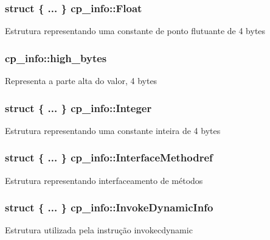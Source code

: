 \subsubsection[{\texorpdfstring{Float}{Float}}]{\setlength{\rightskip}{0pt plus 5cm}struct \{ ... \}   cp\+\_\+info\+::\+Float}\hypertarget{structcp__info_aab782dac6a2cafce3e898190d49329df}{}\label{structcp__info_aab782dac6a2cafce3e898190d49329df}
Estrutura representando uma constante de ponto flutuante de 4 bytes 
\subsubsection[{\texorpdfstring{high\+\_\+bytes}{high_bytes}}]{ cp\+\_\+info\+::high\+\_\+bytes}\hypertarget{structcp__info_a26996f9b4a0caab37c9cdbfd027eaed7}{}\label{structcp__info_a26996f9b4a0caab37c9cdbfd027eaed7}
Representa a parte alta do valor, 4 bytes 
\subsubsection[{\texorpdfstring{Integer}{Integer}}]{\setlength{\rightskip}{0pt plus 5cm}struct \{ ... \}   cp\+\_\+info\+::\+Integer}\hypertarget{structcp__info_a2a51febf186f789356c2ce50ed6219c3}{}\label{structcp__info_a2a51febf186f789356c2ce50ed6219c3}
Estrutura representando uma constante inteira de 4 bytes 
\subsubsection[{\texorpdfstring{Interface\+Methodref}{InterfaceMethodref}}]{\setlength{\rightskip}{0pt plus 5cm}struct \{ ... \}   cp\+\_\+info\+::\+Interface\+Methodref}\hypertarget{structcp__info_a7b323182372d6d7a58f0caf6b762db98}{}\label{structcp__info_a7b323182372d6d7a58f0caf6b762db98}
Estrutura representando interfaceamento de métodos 
\subsubsection[{\texorpdfstring{Invoke\+Dynamic\+Info}{InvokeDynamicInfo}}]{\setlength{\rightskip}{0pt plus 5cm}struct \{ ... \}   cp\+\_\+info\+::\+Invoke\+Dynamic\+Info}\hypertarget{structcp__info_a5697c690cca5206a1fc865fb9a2f8c84}{}\label{structcp__info_a5697c690cca5206a1fc865fb9a2f8c84}
Estrutura utilizada pela instrução invokecdynamic 
